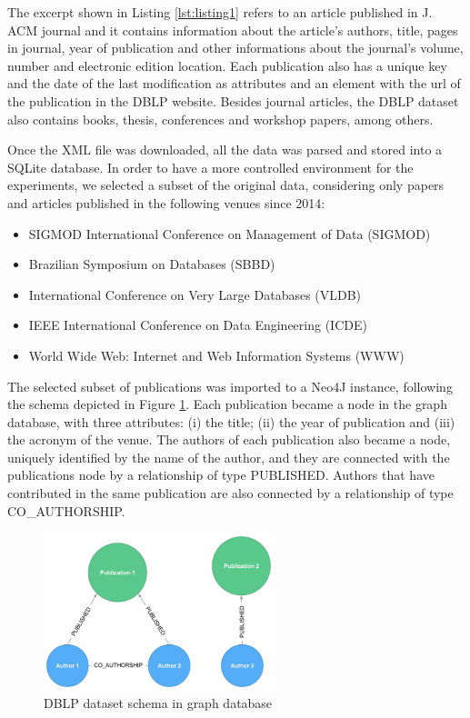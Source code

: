 The excerpt shown in Listing  \ref{lst:listing1} refers to an article published in J. ACM journal and it contains information about the article's authors, title, pages in journal, year of publication and other informations about the journal's volume, number and electronic edition location. Each publication also has a unique key and the date of the last modification as attributes and an element with the url of the publication in the DBLP website. Besides journal articles, the DBLP dataset also contains books, thesis, conferences and workshop papers, among others.

Once the XML file was downloaded, all the data was parsed and stored into a SQLite database. In order to have a more controlled environment for the experiments, we selected a subset of the original data, considering only papers and articles published in the following venues since 2014:

\begin{itemize}
\item SIGMOD International Conference on Management of Data (SIGMOD)
\item Brazilian Symposium on Databases (SBBD)
\item International Conference on Very Large Databases (VLDB)
\item IEEE International Conference on Data Engineering (ICDE)
\item World Wide Web: Internet and Web Information Systems (WWW)
\end{itemize}

The selected subset of publications was imported to a Neo4J instance, following the schema depicted in Figure \ref{fig:figure32}. Each publication became a node in the graph database, with three attributes: (i) the title; (ii) the year of publication and (iii) the acronym of the venue. The authors of each publication also became a node, uniquely identified by the name of the author, and they are connected with the publications node by a relationship of type PUBLISHED. Authors that have contributed in the same publication are also connected by a relationship of type CO\_AUTHORSHIP.

\begin{figure}[ht]
\centering
\includegraphics[width=0.6\textwidth]{../dblp_schema.png}
\caption{DBLP dataset schema in graph database}
\label{fig:figure32}
\end{figure}

